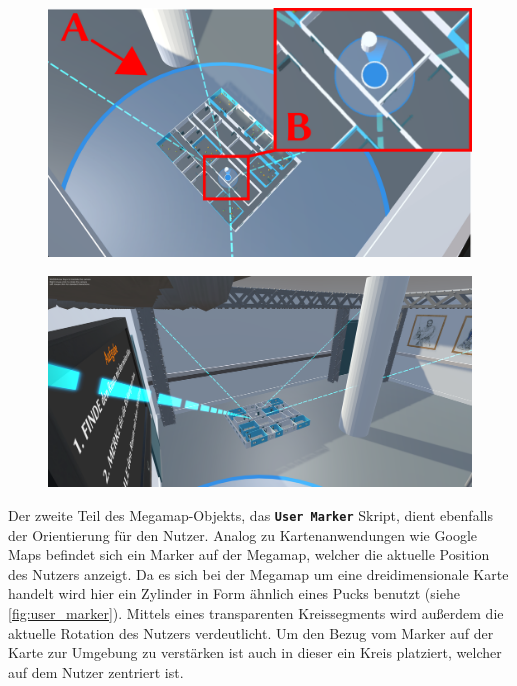 \begin{figure}
    \centering
    \begin{minipage}[t]{.485\textwidth}
        \centering
        \vspace{0pt}
        \includegraphics[width=\linewidth]{figures/megamap_user_marker.pdf}
        \label{fig:user_marker}
        \vfill
    \end{minipage}
    \hfill
    \begin{minipage}[t]{.485\textwidth}
        \centering
        \vspace{0pt}
        \includegraphics[width=\linewidth]{figures/megamap_room_guides}
        \label{fig:room_guides}
    \end{minipage}
\end{figure}

Der zweite Teil des Megamap-Objekts, das \textbf{\lstinline|User Marker|} Skript, dient ebenfalls der Orientierung für den Nutzer.
Analog zu Kartenanwendungen wie Google Maps befindet sich ein Marker auf der Megamap, welcher die aktuelle Position des Nutzers anzeigt.
Da es sich bei der Megamap um eine dreidimensionale Karte handelt wird hier ein Zylinder in Form ähnlich eines Pucks benutzt (siehe \autoref{fig:user_marker}).
Mittels eines transparenten Kreissegments wird außerdem die aktuelle Rotation des Nutzers verdeutlicht.
Um den Bezug vom Marker auf der Karte zur Umgebung zu verstärken ist auch in dieser ein Kreis platziert, welcher auf dem Nutzer zentriert ist.

